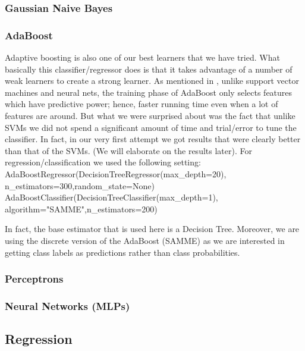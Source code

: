 \documentclass[journal,transmag]{IEEEtran}
\begin{document}
			\subsubsection{Gaussian Naive Bayes}
			
			\subsubsection{AdaBoost}
			\label{adaboost}
			Adaptive boosting is also one of our best learners that we have tried. What basically this classifier/regressor does is that it takes advantage of a number of weak learners to create a strong learner. As mentioned in \cite{adaboost}, unlike support vector machines and neural nets, the training phase of AdaBoost only selects features which have predictive power; hence, faster running time even when a lot of features are around. But what we were surprised about was the fact that unlike SVMs we did not spend a significant amount of time and trial/error to tune the classifier. In fact, in our very first attempt we got results that were clearly better than that of the SVMs. (We will elaborate on the results later). For regression/classification we used the following setting:\\
AdaBoostRegressor(DecisionTreeRegressor(max\_depth=20),\\
n\_estimators=300,random\_state=None)\\
AdaBoostClassifier(DecisionTreeClassifier(max\_depth=1),\\
algorithm="SAMME",n\_estimators=200)

In fact, the base estimator that is used here is a Decision Tree. Moreover, we are using the discrete version of the AdaBoost (SAMME) as we are interested in getting class labels as predictions rather than class probabilities.
			
			\subsubsection{Perceptrons}
			
			\subsubsection{Neural Networks (MLPs)}
			
		\subsection{Regression}
			
\end{document}
